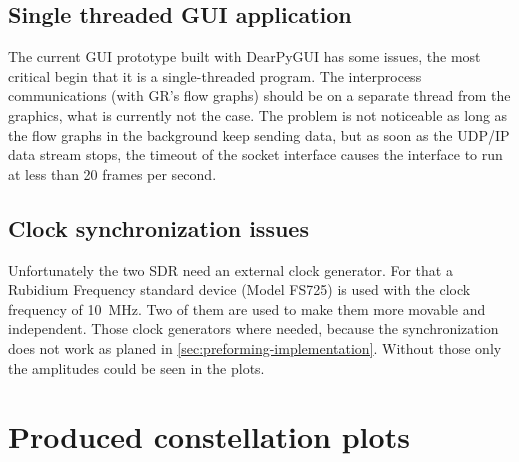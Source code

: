 

\subsection{Single threaded GUI application} \label{sec:gui-issue-single-threaded}

The current GUI prototype built with DearPyGUI has some issues, the most critical begin that it is a single-threaded program. The interprocess communications (with GR's flow graphs) should be on a separate thread from the graphics, what is currently not the case. The problem is not noticeable as long as the flow graphs in the background keep sending data, but as soon as the UDP/IP data stream stops, the timeout of the socket interface causes the interface to run at less than 20 frames per second.



\subsection{Clock synchronization issues}

Unfortunately the two SDR need an external clock generator. For that a Rubidium Frequency standard device (Model FS725) is used with the clock frequency of \SI{10}{\mega\hertz}. Two of them are used to make them more movable and independent. Those clock generators  where needed, because the synchronization does not work as planed in \ref{sec:preforming-implementation}. 
Without those only the amplitudes could be seen in the plots. 


\section{Produced constellation plots}



